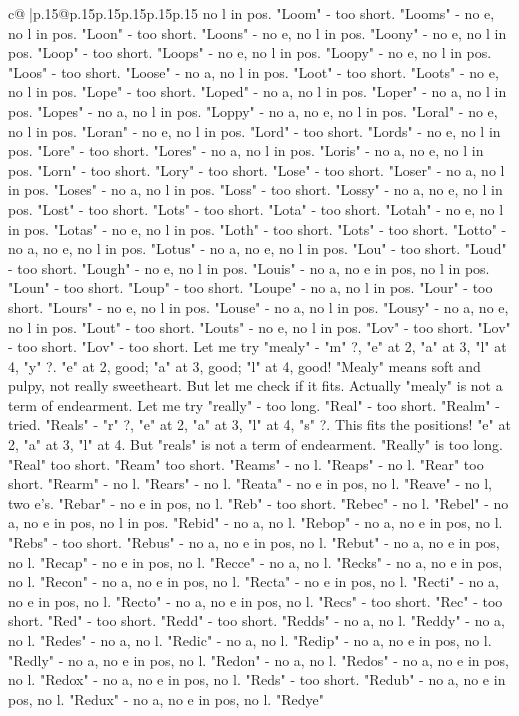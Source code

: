 \documentclass{article}
\begin{document}
{\begin{supertabular}{c@{$\;$}|p{.15\linewidth}@{}p{.15\linewidth}p{.15\linewidth}p{.15\linewidth}p{.15\linewidth}p{.15\linewidth}}
{{{no l in pos. "Loom" {-} too short. "Looms" {-} no e, no l in pos. "Loon" {-} too short. "Loons" {-} no e, no l in pos. "Loony" {-} no e, no l in pos. "Loop" {-} too short. "Loops" {-} no e, no l in pos. "Loopy" {-} no e, no l in pos. "Loos" {-} too short. "Loose" {-} no a, no l in pos. "Loot" {-} too short. "Loots" {-} no e, no l in pos. "Lope" {-} too short. "Loped" {-} no a, no l in pos. "Loper" {-} no a, no l in pos. "Lopes" {-} no a, no l in pos. "Loppy" {-} no a, no e, no l in pos. "Loral" {-} no e, no l in pos. "Loran" {-} no e, no l in pos. "Lord" {-} too short. "Lords" {-} no e, no l in pos. "Lore" {-} too short. "Lores" {-} no a, no l in pos. "Loris" {-} no a, no e, no l in pos. "Lorn" {-} too short. "Lory" {-} too short. "Lose" {-} too short. "Loser" {-} no a, no l in pos. "Loses" {-} no a, no l in pos. "Loss" {-} too short. "Lossy" {-} no a, no e, no l in pos. "Lost" {-} too short. "Lots" {-} too short. "Lota" {-} too short. "Lotah" {-} no e, no l in pos. "Lotas" {-} no e, no l in pos. "Loth" {-} too short. "Lots" {-} too short. "Lotto" {-} no a, no e, no l in pos. "Lotus" {-} no a, no e, no l in pos. "Lou" {-} too short. "Loud" {-} too short. "Lough" {-} no e, no l in pos. "Louis" {-} no a, no e in pos, no l in pos. "Loun" {-} too short. "Loup" {-} too short. "Loupe" {-} no a, no l in pos. "Lour" {-} too short. "Lours" {-} no e, no l in pos. "Louse" {-} no a, no l in pos. "Lousy" {-} no a, no e, no l in pos. "Lout" {-} too short. "Louts" {-} no e, no l in pos. "Lov" {-} too short. "Lov" {-} too short. "Lov" {-} too short. Let me try "mealy" {-} "m" ?, "e" at 2, "a" at 3, "l" at 4, "y" ?. "e" at 2, good; "a" at 3, good; "l" at 4, good! "Mealy" means soft and pulpy, not really sweetheart. But let me check if it fits. Actually "mealy" is not a term of endearment. Let me try "really" {-} too long. "Real" {-} too short. "Realm" {-} tried. "Reals" {-} "r" ?, "e" at 2, "a" at 3, "l" at 4, "s" ?. This fits the positions! "e" at 2, "a" at 3, "l" at 4. But "reals" is not a term of endearment. "Really" is too long. "Real" too short. "Ream" too short. "Reams" {-} no l. "Reaps" {-} no l. "Rear" too short. "Rearm" {-} no l. "Rears" {-} no l. "Reata" {-} no e in pos, no l. "Reave" {-} no l, two e's. "Rebar" {-} no e in pos, no l. "Reb" {-} too short. "Rebec" {-} no l. "Rebel" {-} no a, no e in pos, no l in pos. "Rebid" {-} no a, no l. "Rebop" {-} no a, no e in pos, no l. "Rebs" {-} too short. "Rebus" {-} no a, no e in pos, no l. "Rebut" {-} no a, no e in pos, no l. "Recap" {-} no e in pos, no l. "Recce" {-} no a, no l. "Recks" {-} no a, no e in pos, no l. "Recon" {-} no a, no e in pos, no l. "Recta" {-} no e in pos, no l. "Recti" {-} no a, no e in pos, no l. "Recto" {-} no a, no e in pos, no l. "Recs" {-} too short. "Rec" {-} too short. "Red" {-} too short. "Redd" {-} too short. "Redds" {-} no a, no l. "Reddy" {-} no a, no l. "Redes" {-} no a, no l. "Redic" {-} no a, no l. "Redip" {-} no a, no e in pos, no l. "Redly" {-} no a, no e in pos, no l. "Redon" {-} no a, no l. "Redos" {-} no a, no e in pos, no l. "Redox" {-} no a, no e in pos, no l. "Reds" {-} too short. "Redub" {-} no a, no e in pos, no l. "Redux" {-} no a, no e in pos, no l. "Redye" }}}
\end{supertabular}}
\end{document}
